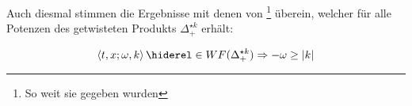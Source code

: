 Auch diesmal stimmen die Ergebnisse mit denen von \textcite[Prop. 3.72]{Schulz2014}\footnote{So weit sie gegeben wurden} überein, welcher für alle Potenzen des getwisteten Produkts $\Delta_+^{\star k}$ erhält:

\begin{equation*}
\left\langle t,x; \omega, k \right\rangle \hiderel\in WF(\Delta_+^{\star k})
\Rightarrow
- \omega \geq |k|
\end{equation*}


